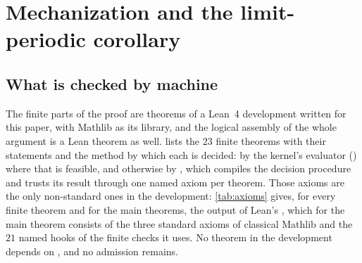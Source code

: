 \section{Mechanization and the limit-periodic corollary}\label{sec:mechanization}

\subsection{What is checked by machine}\label{sec:lean}

The finite parts of the proof are theorems of a Lean~4 development written for this paper, with
Mathlib as its library, and the logical assembly of the whole argument is a Lean theorem as
well.  lists the $23$ finite theorems with their statements and the method by
which each is decided: by the kernel's evaluator () where that is feasible, and
otherwise by , which compiles the decision procedure and trusts its result
through one named axiom per theorem. Those axioms are the only non-standard ones in the
development: \cref{tab:axioms} gives, for every finite theorem and for the main theorems, the
output of Lean's , which for the main theorem consists of the three standard
axioms of classical Mathlib and the $21$ named hooks of the finite checks it uses. No theorem in
the development depends on , and no admission remains.

